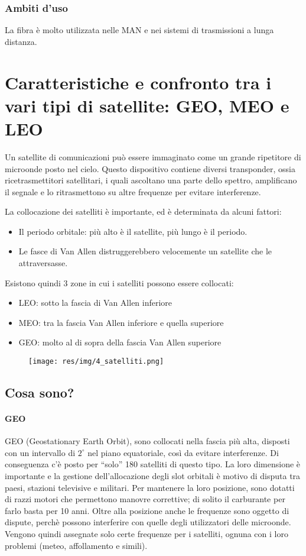 \subsubsection{Ambiti d'uso}
La fibra è molto utilizzata nelle MAN e nei sistemi di trasmissioni a lunga distanza.

\section{Caratteristiche e confronto tra i vari tipi di satellite: GEO, MEO e LEO}\label{satelliti}

Un satellite di comunicazioni può essere immaginato come un grande ripetitore di microonde posto nel cielo.
Questo dispositivo contiene diversi transponder, ossia ricetrasmettitori satellitari, i quali ascoltano una parte dello spettro, amplificano il segnale e lo ritrasmettono su altre frequenze per evitare interferenze.

La collocazione dei satelliti è importante, ed è determinata da alcuni fattori:
\begin{itemize}
\item	Il periodo orbitale: più alto è il satellite, più lungo è il periodo.
\item	Le fasce di Van Allen distruggerebbero velocemente un satellite che le attraversasse.
\end{itemize}
Esistono quindi 3 zone in cui i satelliti possono essere collocati:
\begin{itemize}
\item LEO: sotto la fascia di Van Allen inferiore
\item MEO: tra la fascia Van Allen inferiore e quella superiore
\item GEO: molto al di sopra della fascia Van Allen superiore
\end{itemize}

\begin{figure}[H]
\centering
\texttt{[image: res/img/4\_satelliti.png]}
\end{figure}
\subsection{Cosa sono?}
\paragraph{GEO}
GEO (Geostationary Earth Orbit), sono collocati nella fascia più alta, disposti con un intervallo di $2^{\circ}$ nel piano equatoriale,
così da evitare interferenze. Di conseguenza c'è posto per “solo” 180 satelliti di questo tipo.
La loro dimensione è importante e la gestione dell'allocazione degli slot orbitali è motivo di disputa tra paesi, stazioni televisive e militari.
Per mantenere la loro posizione, sono dotatti di razzi motori che permettono manovre correttive; di solito il carburante per farlo basta per 10 anni.
Oltre alla posizione anche le frequenze sono oggetto di dispute, perchè possono interferire con quelle degli utilizzatori delle microonde.
Vengono quindi assegnate solo certe frequenze per i satelliti, ognuna con i loro problemi (meteo, affollamento e simili).

